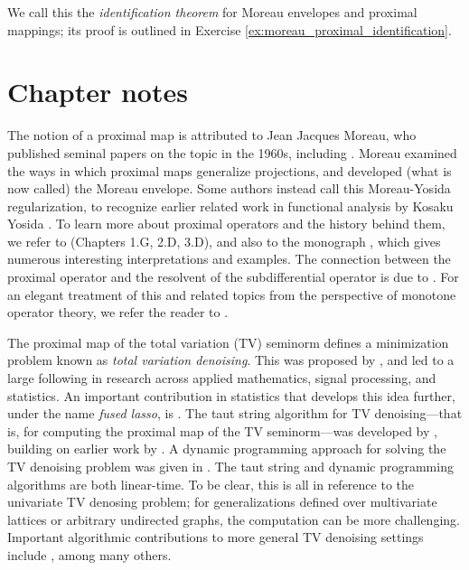 
We call this the \emph{identification theorem} for Moreau envelopes and proximal
mappings; its proof is outlined in Exercise
\ref{ex:moreau_proximal_identification}.  

\SkipTocEntry\section*{Chapter notes}

The notion of a proximal map is attributed to Jean Jacques Moreau, who published  
seminal papers on the topic in the 1960s, including \cite{moreau1962fonctions,
  moreau1963inf, moreau1963proprietes, moreau1965proximite}. Moreau examined the 
ways in which proximal maps generalize projections, and developed (what is now
called) the Moreau envelope. Some authors instead call this Moreau-Yosida
regularization, to recognize earlier related work in functional analysis by
Kosaku Yosida \cite{yosida1948differentiability}. To learn more about proximal
operators and the history behind them, we refer to
\cite{rockafellar2009variational} (Chapters 1.G, 2.D, 3.D), and also to the
monograph \cite{parikh2013proximal}, which gives numerous interesting
interpretations and examples. The connection between the proximal operator and
the resolvent of the subdifferential operator is due to
\cite{rockafellar1976monotone}. For an elegant treatment of this and related
topics from the perspective of monotone operator theory, we refer the reader to 
\cite{bauschke2011convex}.

The proximal map of the total variation (TV) seminorm defines a minimization
problem known as \emph{total variation denoising}. This was proposed by
\cite{rudin1992nonlinear}, and led to a large following in research across
applied mathematics, signal processing, and statistics. An important
contribution in statistics that develops this idea further, under the name
\emph{fused lasso}, is \cite{tibshirani2005sparsity}. The taut string algorithm
for TV denoising---that is, for computing the proximal map of the TV
seminorm---was developed by \cite{davies2001local}, building on earlier work by
\cite{mammen1997locally}. A dynamic programming approach for solving the TV
denoising problem was given in \cite{johnson2013dynamic}. The taut string and
dynamic programming algorithms are both linear-time. To be clear, this is all in
reference to the univariate TV denosing problem; for generalizations defined
over multivariate lattices or arbitrary undirected graphs, the computation can
be more challenging. Important algorithmic contributions to more general TV 
denoising settings include \cite{chambolle2009total, chambolle2011first,
  barbero2018modular}, among many others. 


